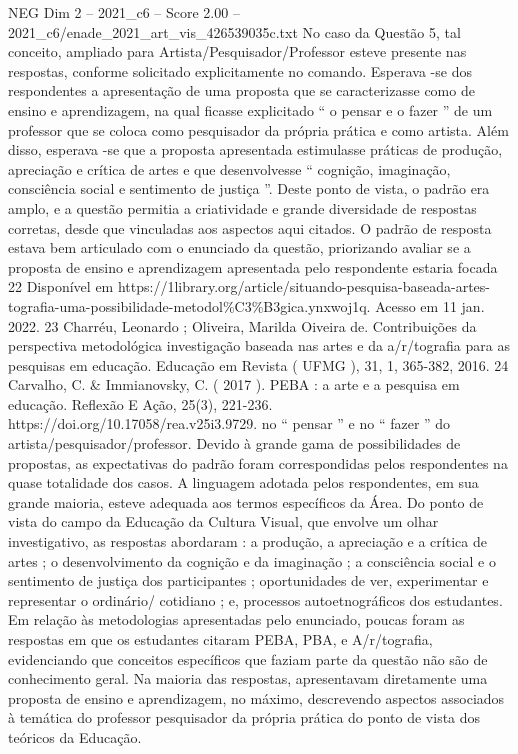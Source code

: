\begin{textsample}{NEG Dim 2 – 2021\_c6 – Score 2.00 – 2021\_c6/enade\_2021\_art\_vis\_426539035c.txt}
No caso da Questão 5, tal conceito, ampliado para Artista/Pesquisador/Professor esteve presente nas respostas, conforme solicitado explicitamente no comando.
Esperava -se dos respondentes a apresentação de uma proposta que se caracterizasse como de ensino e aprendizagem, na qual ficasse explicitado “ o pensar e o fazer ” de um professor que se coloca como pesquisador da própria prática e como artista.
Além disso, esperava -se que a proposta apresentada estimulasse práticas de produção, apreciação e crítica de artes e que desenvolvesse “ cognição, imaginação, consciência social e sentimento de justiça ”.
Deste ponto de vista, o padrão era amplo, e a questão permitia a criatividade e grande diversidade de respostas corretas, desde que vinculadas aos aspectos aqui citados.
O padrão de resposta estava bem articulado com o enunciado da questão, priorizando avaliar se a proposta de ensino e aprendizagem apresentada pelo respondente estaria focada 22 Disponível em https://1library.org/article/situando-pesquisa-baseada-artes-tografia-uma-possibilidade-metodol\%C3\%B3gica.ynxwoj1q.
Acesso em 11 jan. 2022. 23 Charréu, Leonardo ; Oliveira, Marilda Oiveira de.
Contribuições da perspectiva metodológica investigação baseada nas artes e da a/r/tografia para as pesquisas em educação.
Educação em Revista ( UFMG ), 31, 1, 365-382, 2016. 24 Carvalho, C. \& Immianovsky, C. ( 2017 ).
PEBA : a arte e a pesquisa em educação.
Reflexão E Ação, 25(3), 221-236. https://doi.org/10.17058/rea.v25i3.9729. no “ pensar ” e no “ fazer ” do artista/pesquisador/professor.
Devido à grande gama de possibilidades de propostas, as expectativas do padrão foram correspondidas pelos respondentes na quase totalidade dos casos.
A linguagem adotada pelos respondentes, em sua grande maioria, esteve adequada aos termos específicos da Área.
Do ponto de vista do campo da Educação da Cultura Visual, que envolve um olhar investigativo, as respostas abordaram : a produção, a apreciação e a crítica de artes ; o desenvolvimento da cognição e da imaginação ; a consciência social e o sentimento de justiça dos participantes ; oportunidades de ver, experimentar e representar o ordinário/ cotidiano ; e, processos autoetnográficos dos estudantes.
Em relação às metodologias apresentadas pelo enunciado, poucas foram as respostas em que os estudantes citaram PEBA, PBA, e A/r/tografia, evidenciando que conceitos específicos que faziam parte da questão não são de conhecimento geral.
Na maioria das respostas, apresentavam diretamente uma proposta de ensino e aprendizagem, no máximo, descrevendo aspectos associados à temática do professor pesquisador da própria prática do ponto de vista dos teóricos da Educação.

\end{textsample}
